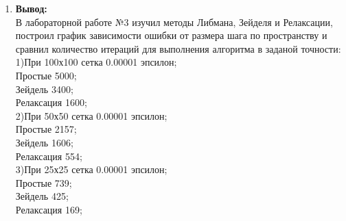 \documentclass[12pt]{article}
\begin{document}
\begin{enumerate}
        \item \textbf{Вывод:}\\
        В лабораторной работе №3 изучил методы Либмана, Зейделя и Релаксации, построил 
        график зависимости ошибки от размера шага по пространству и сравнил 
        количество итераций для выполнения алгоритма в заданой точности: 
        \\1)При 100х100 сетка 0.00001 эпсилон;
        \\Простые 5000;
        \\Зейдель 3400;
        \\Релаксация 1600;
        \\2)При 50х50 сетка 0.00001 эпсилон;
        \\Простые 2157;
        \\Зейдель 1606;
        \\Релаксация 554;
        \\3)При 25х25 сетка 0.00001 эпсилон;
        \\Простые 739;
        \\Зейдель 425;
        \\Релаксация 169;

    \end{enumerate}
\end{document}
